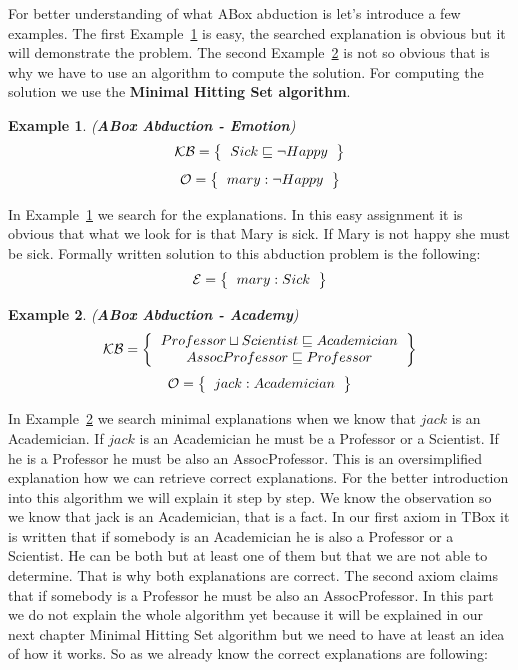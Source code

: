 \documentclass[12pt,a4paper]{article}
\newtheorem{example}{Example}[subsection]
\begin{document}
For better understanding of what ABox abduction is let's introduce a few examples. The first Example~\ref{example:abductionEmotion} is easy, the searched explanation is obvious but it will demonstrate the problem. The second Example~\ref{example:abductionAcademy} is not so obvious that is why we have to use an algorithm to compute the solution. For computing the solution we use the \textbf{Minimal Hitting Set algorithm}.

\begin{example}{(\textbf{ABox Abduction - Emotion})}
	\label{example:abductionEmotion}
	\[ 
	\mathcal{KB} = \left\{
	\begin{tabular}{c c}
	$Sick \sqsubseteq \neg Happy$
	\end{tabular}
	\right \}
	\]
	\[ 
	\mathcal{O} = \left\{
	\begin{tabular}{c c}
	$mary : \neg Happy$
	\end{tabular}
	\right \}
	\]								
\end{example}

In Example~\ref{example:abductionEmotion} we search for the explanations. In this easy assignment it is obvious that what we look for is that Mary is sick. If Mary is not happy she must be sick. Formally written solution to this abduction problem is the following:
\[ 
\mathcal{E} = \left\{
\begin{tabular}{c c}
$mary : Sick$
\end{tabular}
\right \}
\]

\begin{example}{(\textbf{ABox Abduction - Academy})}
	\label{example:abductionAcademy}
	\[ 
	\mathcal{KB} = \left\{
	\begin{tabular}{c c}
		$Professor \sqcup Scientist \sqsubseteq Academician$ \\
		$AssocProfessor \sqsubseteq Professor$ \\
	\end{tabular}
	\right \}
	\]
	\[ 
	\mathcal{O} = \left\{
	\begin{tabular}{c c}
		$jack : Academician$
	\end{tabular}
	\right \}
	\]								
\end{example}

In Example~\ref{example:abductionAcademy} we search minimal explanations when we know that $jack$ is an Academician. If $jack$ is an Academician he must be a Professor or a Scientist. If he is a Professor he must be also an AssocProfessor. This is an oversimplified explanation how we can retrieve correct explanations. For the better introduction into this algorithm we will explain it step by step. We know the observation so we know that jack is an Academician, that is a fact. In our first axiom in TBox it is written that if somebody is an Academician he is also a Professor or a Scientist. He can be both but at least one of them but that we are not able to determine. That is why both explanations are correct. The second axiom claims that if somebody is a Professor he must be also an AssocProfessor. In this part we do not explain the whole algorithm yet because it will be explained in our next chapter Minimal Hitting Set algorithm but we need to have at least an idea of how it works. So as we already know the correct explanations are following:
\end{document}
